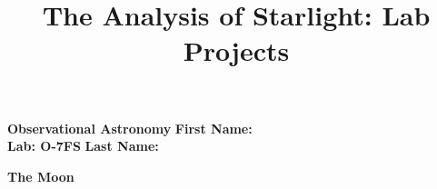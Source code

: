 \documentclass[12pt]{article}
\title{The Analysis of Starlight: Lab Projects}
\begin{document}
\setcounter{page}{1}
\setcounter{equation}{0}
\pagestyle{plain}
\thispagestyle{empty}  %
\newcommand{\kms}{\hbox{km\,s$^{\rm -1}$}}
\def\lo {\ifmmode {\,{\it L}\solar} \else $\,L$\solar\fi}       %
\def\my {\ifmmode {\,{\it M}\solar\,{\rm yr^{-1}}}              %
        \else {$\,M$\solar$\,$yr$^{\rm -1}$}\fi}
\def\BD {BD$\,$+30{\degr}3639}
\def\HUNO{\rm H$\,$I}                   %
\def\HDOS{\rm H$_2$}                    %
\def\arcsec{\ifmmode {^{\scriptscriptstyle\prime\prime}}
          \else $^{\scriptscriptstyle\prime\prime}$\fi}
\def\arcmin{\ifmmode {^{\scriptscriptstyle\prime}}
          \else $^{\scriptscriptstyle\prime}$\fi}
\def\deg{\ifmmode^\circ\else$^\circ$\fi}

\sloppy



\noindent
{\bf Observational Astronomy    \hfill} {\bf First Name:\makebox[4cm]{\hrulefill}}\\
{\bf Lab: O-7FS} \hfill {\bf Last Name:\makebox[4cm]{\hrulefill}}


\bigskip

\medskip

\noindent
{\hfill \Large {\bf The Moon } \hfill}


\bigskip


\end{document}
